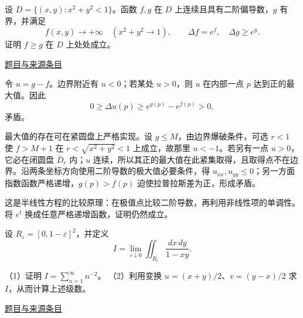 \documentclass[12pt,fontset=fandol]{ctexart}
\begin{document}
\begin{example}[来源序号7]\label{ex:fin01-all:7}\label{pr:fin01-all:7}

设 $D=\{(x,y):x^2+y^2<1\}$。函数 $f,g$ 在 $D$ 上连续且具有二阶偏导数，$g$ 有界，并满足
\[
f(x,y)\longrightarrow+\infty\quad(x^2+y^2\to1),
\qquad \Delta f=e^f,\quad \Delta g\ge e^g.
\]
证明 $f\ge g$ 在 $D$ 上处处成立。

\par\href{https://github.com/lzxcr/cmc-mathematics/blob/64916fa1fdbc3e444a652eca204d5669058ee321/src/problems/finals/01/07.md}{题目与来源条目}

\end{example}

\begin{solve}\label{ans:fin01-all:7}

令 $u=g-f$。边界附近有 $u<0$；若某处 $u>0$，则 $u$ 在内部一点 $p$ 达到正的最大值。因此
\[
0\ge\Delta u(p)\ge e^{g(p)}-e^{f(p)}>0,
\]
矛盾。

最大值的存在可在紧圆盘上严格实现。设 $g\le M$，由边界爆破条件，可选 $r<1$ 使 $f>M+1$ 在 $r<\sqrt{x^2+y^2}<1$ 上成立，故那里 $u<-1$。若另有一点 $u>0$，它必在闭圆盘 $\overline D_r$ 内；$u$ 连续，所以其正的最大值在此紧集取得，且取得点不在边界。沿两条坐标方向使用二阶导数的极大值必要条件，得 $u_{xx},u_{yy}\le0$；另一方面指数函数严格递增，$g(p)>f(p)$ 迫使拉普拉斯差为正，形成矛盾。

\end{solve}

\begin{remark}[方法与条件]这是半线性方程的比较原理：在极值点比较二阶导数，再利用非线性项的单调性。将 $e^t$ 换成任意严格递增函数，证明仍然成立。\end{remark}

\begin{example}[来源序号8]\label{ex:fin01-all:8}\label{pr:fin01-all:8}

设 $R_\varepsilon=[0,1-\varepsilon]^2$，并定义
\[
I=\lim_{\varepsilon\downarrow0}\iint_{R_\varepsilon}\frac{dx\,dy}{1-xy}.
\]

（1）证明 $I=\sum_{n=1}^\infty n^{-2}$。
（2）利用变换 $u=(x+y)/2$、$v=(y-x)/2$ 求 $I$，从而计算上述级数。

\par\href{https://github.com/lzxcr/cmc-mathematics/blob/64916fa1fdbc3e444a652eca204d5669058ee321/src/problems/finals/01/08.md}{题目与来源条目}

\end{example}
\end{document}
